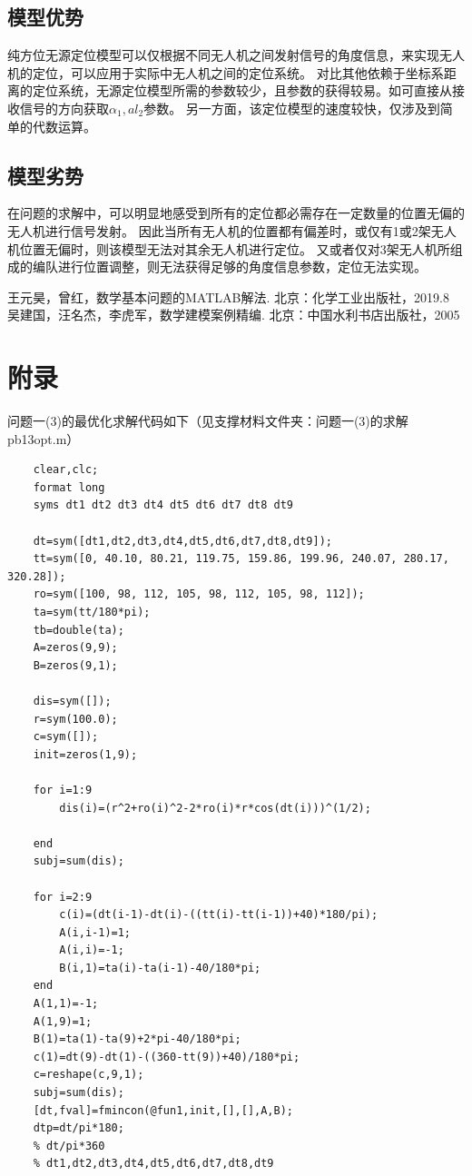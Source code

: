 \documentclass{ctexart}
\def\al{\alpha}
\begin{document}
	\subsection{模型优势}
	纯方位无源定位模型可以仅根据不同无人机之间发射信号的角度信息，来实现无人机的定位，可以应用于实际中无人机之间的定位系统。
	对比其他依赖于坐标系距离的定位系统，无源定位模型所需的参数较少，且参数的获得较易。如可直接从接收信号的方向获取$\al_1,al_2$参数。
	另一方面，该定位模型的速度较快，仅涉及到简单的代数运算。

	\subsection{模型劣势}
	在问题的求解中，可以明显地感受到所有的定位都必需存在一定数量的位置无偏的无人机进行信号发射。
	因此当所有无人机的位置都有偏差时，或仅有1或2架无人机位置无偏时，则该模型无法对其余无人机进行定位。
	又或者仅对3架无人机所组成的编队进行位置调整，则无法获得足够的角度信息参数，定位无法实现。
	
\begin{thebibliography}{9} %
		王元昊，曾红，数学基本问题的MATLAB解法. 北京：化学工业出版社，2019.8
		吴建国，汪名杰，李虎军，数学建模案例精编. 北京：中国水利书店出版社，2005	
\end{thebibliography}
	
	\newpage
	\section{附录}

	问题一(3)的最优化求解代码如下（见支撑材料文件夹：问题一(3)的求解 pb13opt.m）
	\begin{lstlisting}
	clear,clc;
	format long
	syms dt1 dt2 dt3 dt4 dt5 dt6 dt7 dt8 dt9
	
	dt=sym([dt1,dt2,dt3,dt4,dt5,dt6,dt7,dt8,dt9]);
	tt=sym([0, 40.10, 80.21, 119.75, 159.86, 199.96, 240.07, 280.17, 320.28]);
	ro=sym([100, 98, 112, 105, 98, 112, 105, 98, 112]);
	ta=sym(tt/180*pi);
	tb=double(ta);
	A=zeros(9,9);
	B=zeros(9,1);
	
	dis=sym([]);
	r=sym(100.0);
	c=sym([]);
	init=zeros(1,9);

	for i=1:9
		dis(i)=(r^2+ro(i)^2-2*ro(i)*r*cos(dt(i)))^(1/2);
		
	end
	subj=sum(dis);

	for i=2:9
		c(i)=(dt(i-1)-dt(i)-((tt(i)-tt(i-1))+40)*180/pi);
		A(i,i-1)=1;
		A(i,i)=-1;
		B(i,1)=ta(i)-ta(i-1)-40/180*pi;
	end
	A(1,1)=-1;
	A(1,9)=1;
	B(1)=ta(1)-ta(9)+2*pi-40/180*pi;
	c(1)=dt(9)-dt(1)-((360-tt(9))+40)/180*pi;
	c=reshape(c,9,1);
	subj=sum(dis);
	[dt,fval]=fmincon(@fun1,init,[],[],A,B);
	dtp=dt/pi*180;
	% dt/pi*360
	% dt1,dt2,dt3,dt4,dt5,dt6,dt7,dt8,dt9
	\end{lstlisting}
\end{document}
